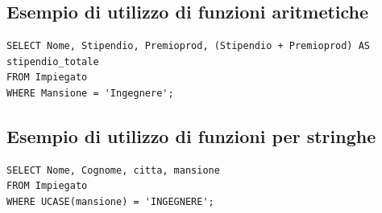 \subsection{Esempio di utilizzo di funzioni aritmetiche}
\begin{lstlisting}[language=sql_generic]
SELECT Nome, Stipendio, Premioprod, (Stipendio + Premioprod) AS stipendio_totale
FROM Impiegato
WHERE Mansione = 'Ingegnere';
\end{lstlisting}
\subsection{Esempio di utilizzo di funzioni per stringhe}
\begin{lstlisting}[language=sql_generic]
SELECT Nome, Cognome, citta, mansione
FROM Impiegato
WHERE UCASE(mansione) = 'INGEGNERE';
\end{lstlisting}